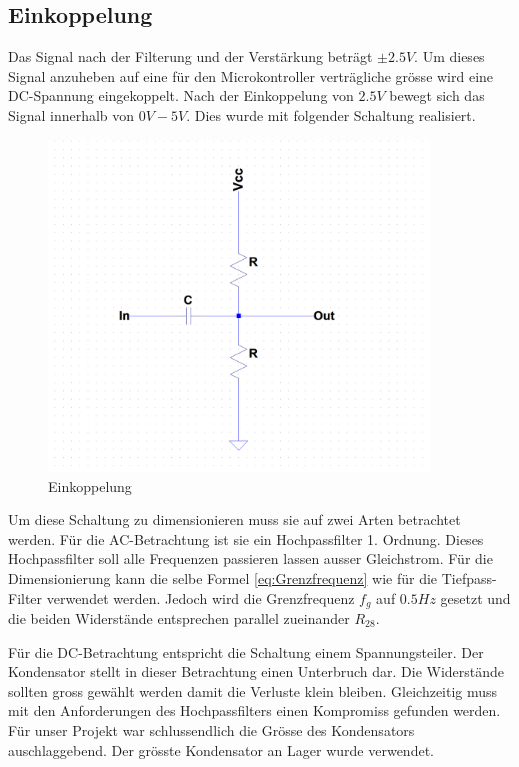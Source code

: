 \subsection{Einkoppelung}
Das Signal nach der Filterung und der Verstärkung beträgt $\pm 2.5V$. Um dieses Signal anzuheben auf eine für den Microkontroller verträgliche grösse wird eine DC-Spannung eingekoppelt. Nach der Einkoppelung von $2.5V$ bewegt sich das Signal innerhalb von $0V - 5V$. Dies wurde mit folgender Schaltung realisiert.

\begin{minipage}[h]{0.5\textwidth}
\begin{figure}[H]
\begin{center}
\includegraphics[width=0.9\textwidth]{images/Analoge_Schaltung_Einkoppelung.png}
\caption{Einkoppelung}
\end{center}
\end{figure}
\end{minipage}
\begin{minipage}[h]{0.5\textwidth} 
Um diese Schaltung zu dimensionieren muss sie auf zwei Arten betrachtet werden. 
Für die AC-Betrachtung ist sie ein Hochpassfilter 1. Ordnung. Dieses Hochpassfilter soll alle Frequenzen passieren lassen ausser Gleichstrom. Für die Dimensionierung kann die selbe Formel \eqref{eq:Grenzfrequenz} wie für die Tiefpass-Filter verwendet werden. Jedoch wird die Grenzfrequenz $f_g$ auf $0.5 Hz$ gesetzt und die beiden Widerstände entsprechen parallel zueinander $R_{28}$.
\end{minipage}
Für die DC-Betrachtung entspricht die Schaltung einem Spannungsteiler. Der Kondensator stellt in dieser Betrachtung einen Unterbruch dar. Die Widerstände sollten gross gewählt werden damit die Verluste klein bleiben. Gleichzeitig muss mit den Anforderungen des Hochpassfilters einen Kompromiss gefunden werden. Für unser Projekt war schlussendlich die Grösse des Kondensators auschlaggebend. Der grösste Kondensator an Lager wurde verwendet.


